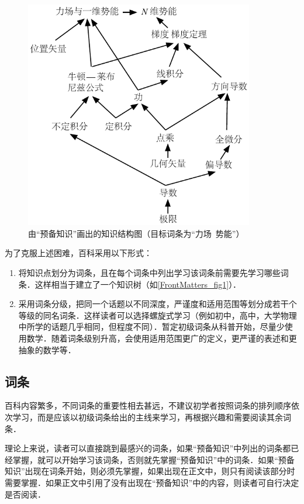 \begin{figure}[ht]
\centering
\includegraphics[width=10cm]{./figures/flowchart_example.pdf}
\caption{由“预备知识”画出的知识结构图（目标词条为“力场\ 势能”）}\label{FrontMatters_fig1}
\end{figure}

为了克服上述困难，百科采用以下形式：
\begin{enumerate}
\item 将知识点划分为词条，且在每个词条中列出学习该词条前需要先学习哪些词条．这样相当于建立了一个知识树（如\autoref{FrontMatters_fig1}）．
\item 采用词条分级，把同一个话题以不同深度，严谨度和适用范围等划分成若干个等级的同名词条．这样读者可以选择螺旋式学习（例如初中，高中，大学物理中所学的话题几乎相同，但程度不同）．暂定初级词条从科普开始，尽量少使用数学．随着词条级别升高，会使用适用范围更广的定义，更严谨的表述和更抽象的数学等．
\end{enumerate}

\subsection{词条}
百科内容繁多，不同词条的重要性相去甚远，不建议初学者按照词条的排列顺序依次学习，而是应该以初级词条给出的主线来学习，再根据兴趣和需要阅读其余词条．

理论上来说，读者可以直接跳到最感兴的词条，如果“预备知识”中列出的词条都已经掌握，就可以开始学习该词条，否则就先掌握“预备知识”中的词条．如果“预备知识”出现在词条开始，则必须先掌握，如果出现在正文中，则只有阅读该部分时需要掌握．如果正文中引用了没有出现在“预备知识”中的内容，则读者可自行决定是否阅读．

